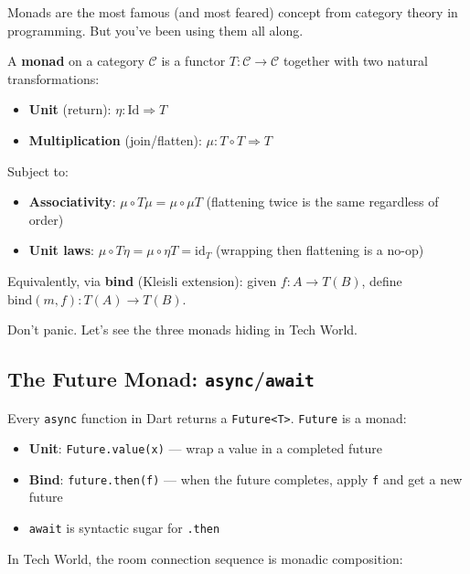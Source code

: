\documentclass[12pt,a4paper]{article}
\theoremstyle{definition}
\theoremstyle{plain}
\theoremstyle{remark}
\begin{document}
Monads are the most famous (and most feared) concept from category theory
in programming. But you've been using them all along.

\begin{formal}
A \textbf{monad} on a category $\mathcal{C}$ is a functor
$T \colon \mathcal{C} \to \mathcal{C}$ together with two natural
transformations:
\begin{itemize}
  \item \textbf{Unit} (return): $\eta \colon \mathrm{Id} \Rightarrow T$
  \item \textbf{Multiplication} (join/flatten):
        $\mu \colon T \circ T \Rightarrow T$
\end{itemize}
Subject to:
\begin{itemize}
  \item \textbf{Associativity}: $\mu \circ T\mu = \mu \circ \mu T$
        (flattening twice is the same regardless of order)
  \item \textbf{Unit laws}: $\mu \circ T\eta = \mu \circ \eta T = \mathrm{id}_T$
        (wrapping then flattening is a no-op)
\end{itemize}
Equivalently, via \textbf{bind} (Kleisli extension):
given $f \colon A \to T(B)$, define
$\mathrm{bind}(m, f) \colon T(A) \to T(B)$.
\end{formal}

Don't panic. Let's see the three monads hiding in Tech World.

\subsection{The Future Monad: \texttt{async}/\texttt{await}}

\begin{youknow}
Every \texttt{async} function in Dart returns a \texttt{Future<T>}.
\texttt{Future} is a monad:
\begin{itemize}
  \item \textbf{Unit}: \texttt{Future.value(x)} --- wrap a value in a completed future
  \item \textbf{Bind}: \texttt{future.then(f)} --- when the future completes,
        apply \texttt{f} and get a new future
  \item \texttt{await} is syntactic sugar for \texttt{.then}
\end{itemize}
\end{youknow}

In Tech World, the room connection sequence is monadic composition:
\end{document}
